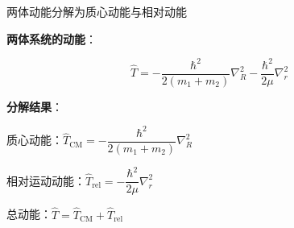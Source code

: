 \begin{frame}{两体动能分解为质心动能与相对动能}

  
    \begin{iqbitemize}
    \item \textbf{两体系统的动能}：
    \end{iqbitemize}
    \[
      \hat{T} = -\dfrac{\hbar^2}{2(m_1+m_2)}\nabla_R^2 - \dfrac{\hbar^2}{2\mu}\nabla_r^2
    \]
    \begin{iqbitemize}
    \item \textbf{分解结果}：
    \begin{iqbitemize}
      \item 质心动能：$\hat{T}_{\text{CM}} = -\dfrac{\hbar^2}{2(m_1+m_2)}\nabla_R^2$
      \item 相对运动动能：$\hat{T}_{\text{rel}} = -\dfrac{\hbar^2}{2\mu}\nabla_r^2$
      \item 总动能：$\hat{T} = \hat{T}_{\text{CM}} + \hat{T}_{\text{rel}}$
    \end{iqbitemize}
    \end{iqbitemize}

  
\end{frame}

